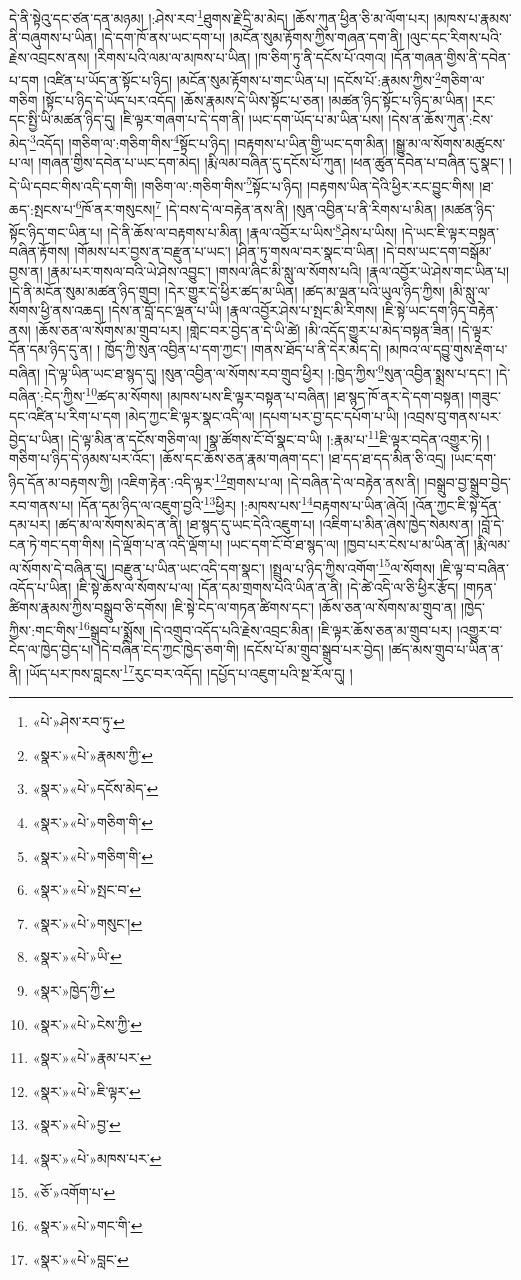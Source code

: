 དེ་ནི་སྟེའུ་དང་ཙན་དན་མཉམ། །:ཤེས་རབ་\footnote{«པེ་»ཤེས་རབ་ཏུ་}ཐུགས་རྗེ་དྲི་མ་མེད། །ཆོས་ཀུན་ཕྱིན་ཅི་མ་ལོག་པར། །མཁས་པ་རྣམས་ནི་བཞུགས་པ་ཡིན། །དེ་དག་ཁོ་ནས་ཡང་དག་པ། །མངོན་སུམ་རྟོགས་ཀྱིས་གཞན་དག་ནི། །ལུང་དང་རིགས་པའི་རྗེས་འབྲངས་ནས། །རིགས་པའི་ལམ་ལ་མཁས་པ་ཡིན། །ཁ་ཅིག་ཏུ་ནི་དངོས་པོ་འགའ། །དོན་གཞན་གྱིས་ནི་དབེན་པ་དག །འཛིན་པ་ཡོད་ན་སྟོང་པ་ཉིད། །མངོན་སུམ་རྟོགས་པ་གང་ཡིན་པ། །དངོས་པོ་:རྣམས་ཀྱིས་\footnote{«སྣར་»«པེ་»རྣམས་ཀྱི་}གཅིག་ལ་གཅིག །སྟོང་པ་ཉིད་དེ་ཡོད་པར་འདོད། །ཆོས་རྣམས་དེ་ཡིས་སྟོང་པ་ཅན། །མཚན་ཉིད་སྟོང་པ་ཉིད་མ་ཡིན། །རང་དང་སྤྱི་ཡི་མཚན་ཉིད་དུ། །ཇི་ལྟར་གཞག་པ་དེ་དག་ནི། །ཡང་དག་ཡོད་པ་མ་ཡིན་པས། །དེས་ན་ཆོས་ཀུན་:ངེས་མེད་\footnote{«སྣར་»«པེ་»དངོས་མེད་}འདོད། །གཅིག་ལ་:གཅིག་གིས་\footnote{«སྣར་»«པེ་»གཅིག་གི་}སྟོང་པ་ཉིད། །བརྟགས་པ་ཡིན་གྱི་ཡང་དག་མིན། །སྒྱུ་མ་ལ་སོགས་མཚུངས་པ་ལ། །གཞན་གྱིས་དབེན་པ་ཡང་དག་མེད། །རྨི་ལམ་བཞིན་དུ་དངོས་པོ་ཀུན། །ཕན་ཚུན་དབེན་པ་བཞིན་དུ་སྣང་། །དེ་ཡི་དབང་གིས་འདི་དག་གི། །གཅིག་ལ་:གཅིག་གིས་\footnote{«སྣར་»«པེ་»གཅིག་གི་}སྟོང་པ་ཉིད། །བརྟགས་ཡིན་དེའི་ཕྱིར་རང་བྱུང་གིས། །ཐ་ཆད་:སྤངས་པ་\footnote{«སྣར་»«པེ་»སྤང་བ་}ཁོ་ནར་གསུངས།\footnote{«སྣར་»«པེ་»གསུང་།} །དེ་བས་དེ་ལ་བརྟེན་ནས་ནི། །སུན་འབྱིན་པ་ནི་རིགས་པ་མིན། །མཚན་ཉིད་སྟོང་ཉིད་གང་ཡིན་པ། །དེ་ནི་ཆོས་ལ་བརྟགས་པ་མིན། །རྣལ་འབྱོར་པ་ཡིས་\footnote{«སྣར་»«པེ་»ཡི་}ཤེས་པ་ཡིས། །དེ་ཡང་ཇི་ལྟར་བསྟན་བཞིན་རྟོགས། །གོམས་པར་བྱས་ན་བརྫུན་པ་ཡང་། །ཤིན་ཏུ་གསལ་བར་སྣང་བ་ཡིན། །དེ་བས་ཡང་དག་བསྒོམ་བྱས་ན། །རྣམ་པར་གསལ་བའི་ཡེ་ཤེས་འབྱུང་། །གསལ་ཞིང་མི་སླུ་ལ་སོགས་པའི། །རྣལ་འབྱོར་ཡེ་ཤེས་གང་ཡིན་པ། །དེ་ནི་མངོན་སུམ་མཚན་ཉིད་གྲུབ། །དེར་གྱུར་དེ་ཕྱིར་ཚད་མ་ཡིན། །ཚད་མ་ལྡན་པའི་ཡུལ་ཉིད་ཀྱིས། །མི་སླུ་ལ་སོགས་ཕྱི་ནས་འཆད། །དེས་ན་བློ་དང་ལྡན་པ་ཡི། །རྣལ་འབྱོར་ཤེས་པ་སྤང་མི་རིགས། །ཇི་སྟེ་ཡང་དག་ཉིད་བརྟེན་ནས། །ཆོས་ཅན་ལ་སོགས་མ་གྲུབ་པར། །གླེང་བར་བྱེད་ན་དེ་ཡི་ཚེ། །མི་འདོད་གྱུར་པ་མེད་བསྟན་ཟིན། །དེ་ལྟར་དོན་དམ་ཉིད་དུ་ན། །
ཁྱོད་ཀྱི་སུན་འབྱིན་པ་དག་ཀྱང་། །གནས་ཐོད་པ་ནི་དེར་མེད་དེ། །མཁའ་ལ་དབྱུ་གུས་རྡེག་པ་བཞིན། །དེ་ལྟ་ཡིན་ཡང་ཐ་སྙད་དུ། །སུན་འབྱིན་ལ་སོགས་རབ་གྲུབ་ཕྱིར། །:ཁྱེད་ཀྱིས་\footnote{«སྣར་»ཁྱེད་ཀྱི་}སུན་འབྱིན་སྨྲས་པ་དང་། །དེ་བཞིན་:ངེད་ཀྱིས་\footnote{«སྣར་»«པེ་»ངེས་ཀྱི་}ཚད་མ་སོགས། །མཁས་པས་ཇི་ལྟར་བསྟན་པ་བཞིན། །ཐ་སྙད་ཁོ་ནར་དེ་དག་བསྟན། །གཟུང་དང་འཛིན་པ་རིག་པ་དག །མེད་ཀྱང་ཇི་ལྟར་སྣང་འདི་ལ། །དཔག་པར་བྱ་དང་དཔོག་པ་ཡི། །འབྲས་བུ་གནས་པར་བྱེད་པ་ཡིན། །དེ་ལྟ་མིན་ན་དངོས་གཅིག་ལ། །སྣ་ཚོགས་ངོ་བོ་སྣང་བ་ཡི། །:རྣམ་པ་\footnote{«སྣར་»«པེ་»རྣམ་པར་}ཇི་ལྟར་བདེན་འགྱུར་ཏེ། །གཅིག་པ་ཉིད་དེ་ཉམས་པར་འོང་། །ཆོས་དང་ཆོས་ཅན་རྣམ་གཞག་དང་། །ཐ་དད་ཐ་དད་མིན་ཅི་འདྲ། །ཡང་དག་ཉིད་དོན་མ་བརྟགས་ཀྱི། །འཇིག་རྟེན་:འདི་ལྟར་\footnote{«སྣར་»«པེ་»ཇི་ལྟར་}གྲགས་པ་ལ། །དེ་བཞིན་དེ་ལ་བརྟེན་ནས་ནི། །བསྒྲུབ་བྱ་སྒྲུབ་བྱེད་རབ་གནས་པ། །དོན་དམ་ཉིད་ལ་འཇུག་བྱའི་\footnote{«སྣར་»«པེ་»བྱ་}ཕྱིར། །:མཁས་པས་\footnote{«སྣར་»«པེ་»མཁས་པར་}བརྟགས་པ་ཡིན་ཞེའོ། །འོན་ཀྱང་ཇི་སྟེ་དོན་དམ་པར། །ཚད་མ་ལ་སོགས་མེད་ན་ནི། །ཐ་སྙད་དུ་ཡང་དེའི་འཇུག་པ། །འཇིག་པ་མིན་ཞེས་ཁྱེད་སེམས་ན། །བློ་དེ་ངན་ཏེ་གང་དག་གིས། །དེ་ལྡོག་པ་ན་འདི་ལྡོག་པ། །ཡང་དག་ངོ་བོ་ཐ་སྙད་ལ། །ཁྱབ་པར་ངེས་པ་མ་ཡིན་ནོ། །རྨི་ལམ་ལ་སོགས་དེ་བཞིན་དུ། །བརྫུན་པ་ཡིན་ཡང་འདི་དག་སྣང་། །སྤྲུལ་པ་ཉིད་ཀྱིས་འགོག་\footnote{«ཅོ་»འགོག་པ་}ལ་སོགས། །ཇི་ལྟ་བ་བཞིན་འདོད་པ་ཡིན། །ཇི་སྟེ་ཆོས་ལ་སོགས་པ་ལ། །དོན་དམ་གྲགས་པའི་ཡིན་ན་ནི། །དེ་ཚེ་འདི་ལ་ཅི་ཕྱིར་རྩོད། །གཏན་ཚིགས་རྣམས་ཀྱིས་བསྒྲུབ་ཅི་དགོས། །ཇི་སྟེ་ངེད་ལ་གཏན་ཚིགས་དང་། །ཆོས་ཅན་ལ་སོགས་མ་གྲུབ་ན། །ཁྱེད་ཀྱིས་:གང་གིས་\footnote{«སྣར་»«པེ་»གང་གི་}སྒྲུབ་པ་སྨྲོས། །དེ་འགྲུབ་འདོད་པའི་རྗེས་འབྲང་མིན། །ཇི་ལྟར་ཆོས་ཅན་མ་གྲུབ་པར། །འགྱུར་བ་ངེད་ལ་ཁྱེད་བྱེད་པ། །དེ་བཞིན་ངེད་ཀྱང་ཁྱེད་ཅག་གི། །དངོས་པོ་མ་གྲུབ་སྒྲུབ་པར་བྱེད། །ཚད་མས་གྲུབ་པ་ཡིན་ན་ནི། །ཡོད་པར་ཁས་བླངས་\footnote{«སྣར་»«པེ་»བླང་}རུང་བར་འདོད། །དཔྱོད་པ་འཇུག་པའི་སྔ་རོལ་དུ། །
